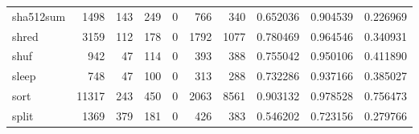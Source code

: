 \begin{longtable}{lrrrrrrrrr}
sha512sum &                                               1498 &                                                143 &                                                249 &                                                  0 &                                                766 &                                                340 &                                           0.652036 &                               0.904539 &                             0.226969 \\
shred     &                                               3159 &                                                112 &                                                178 &                                                  0 &                                               1792 &                                               1077 &                                           0.780469 &                               0.964546 &                             0.340931 \\
shuf      &                                                942 &                                                 47 &                                                114 &                                                  0 &                                                393 &                                                388 &                                           0.755042 &                               0.950106 &                             0.411890 \\
sleep     &                                                748 &                                                 47 &                                                100 &                                                  0 &                                                313 &                                                288 &                                           0.732286 &                               0.937166 &                             0.385027 \\
sort      &                                              11317 &                                                243 &                                                450 &                                                  0 &                                               2063 &                                               8561 &                                           0.903132 &                               0.978528 &                             0.756473 \\
split     &                                               1369 &                                                379 &                                                181 &                                                  0 &                                                426 &                                                383 &                                           0.546202 &                               0.723156 &                             0.279766 \\

\end{longtable}
